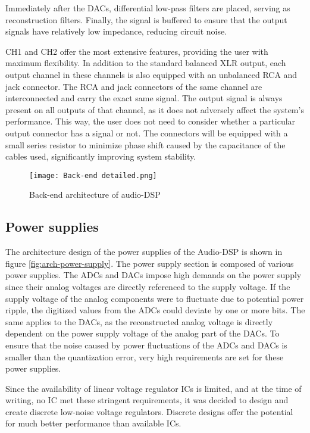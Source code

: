 Immediately after the DACs, differential low-pass filters are placed, serving as reconstruction filters. Finally, the signal is buffered to ensure that the output signals have relatively low impedance, reducing circuit noise.

CH1 and CH2 offer the most extensive features, providing the user with maximum flexibility. In addition to the standard balanced XLR output, each output channel in these channels is also equipped with an unbalanced RCA and jack connector. The RCA and jack connectors of the same channel are interconnected and carry the exact same signal. The output signal is always present on all outputs of that channel, as it does not adversely affect the system's performance. This way, the user does not need to consider whether a particular output connector has a signal or not. The connectors will be equipped with a small series resistor to minimize phase shift caused by the capacitance of the cables used, significantly improving system stability.

\begin{figure}[ht]
    \texttt{[image: Back-end detailed.png]}\\    
    \caption{Back-end architecture of audio-DSP}
    \label{fig:arch-back-end}
\end{figure}

\subsection{Power supplies}
The architecture design of the power supplies of the Audio-DSP is shown in figure \ref{fig:arch-power-supply}. The power supply section is composed of various power supplies. The ADCs and DACs impose high demands on the power supply since their analog voltages are directly referenced to the supply voltage. If the supply voltage of the analog components were to fluctuate due to potential power ripple, the digitized values from the ADCs could deviate by one or more bits. The same applies to the DACs, as the reconstructed analog voltage is directly dependent on the power supply voltage of the analog part of the DACs. To ensure that the noise caused by power fluctuations of the ADCs and DACs is smaller than the quantization error, very high requirements are set for these power supplies.

Since the availability of linear voltage regulator ICs is limited, and at the time of writing, no IC met these stringent requirements, it was decided to design and create discrete low-noise voltage regulators. Discrete designs offer the potential for much better performance than available ICs.

